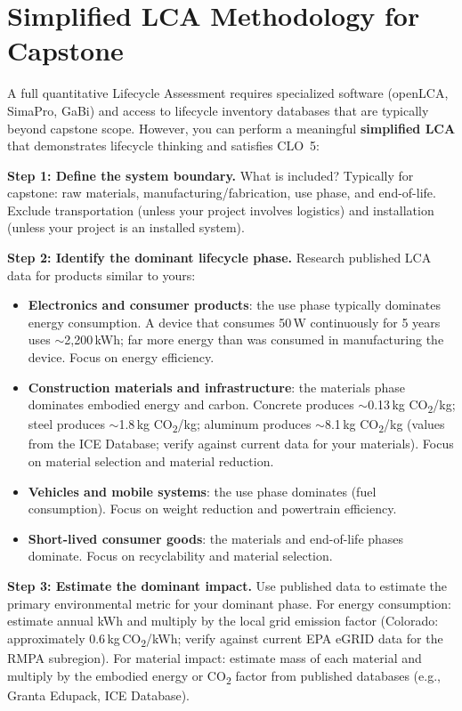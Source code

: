 \section{Simplified LCA Methodology for Capstone}
A full quantitative Lifecycle Assessment requires specialized software (openLCA, SimaPro, GaBi) and access to lifecycle inventory databases that are typically beyond capstone scope. However, you can perform a meaningful \textbf{simplified LCA} that demonstrates lifecycle thinking and satisfies CLO~5:

\textbf{Step 1: Define the system boundary.} What is included? Typically for capstone: raw materials, manufacturing/fabrication, use phase, and end-of-life. Exclude transportation (unless your project involves logistics) and installation (unless your project is an installed system).

\textbf{Step 2: Identify the dominant lifecycle phase.} Research published LCA data for products similar to yours:
\begin{itemize}[nosep,leftmargin=1.5em]
\item \textbf{Electronics and consumer products}: the use phase typically dominates energy consumption. A device that consumes 50\,W continuously for 5 years uses $\sim$2,200\,kWh; far more energy than was consumed in manufacturing the device. Focus on energy efficiency.
\item \textbf{Construction materials and infrastructure}: the materials phase dominates embodied energy and carbon. Concrete produces $\sim$0.13\,kg CO\textsubscript{2}/kg; steel produces $\sim$1.8\,kg CO\textsubscript{2}/kg; aluminum produces $\sim$8.1\,kg CO\textsubscript{2}/kg (values from the ICE Database; verify against current data for your materials). Focus on material selection and material reduction.
\item \textbf{Vehicles and mobile systems}: the use phase dominates (fuel consumption). Focus on weight reduction and powertrain efficiency.
\item \textbf{Short-lived consumer goods}: the materials and end-of-life phases dominate. Focus on recyclability and material selection.
\end{itemize}

\textbf{Step 3: Estimate the dominant impact.} Use published data to estimate the primary environmental metric for your dominant phase. For energy consumption: estimate annual kWh and multiply by the local grid emission factor (Colorado: approximately 0.6\,kg\,CO\textsubscript{2}/kWh; verify against current EPA eGRID data for the RMPA subregion). For material impact: estimate mass of each material and multiply by the embodied energy or CO\textsubscript{2} factor from published databases (e.g., Granta Edupack, ICE Database).

